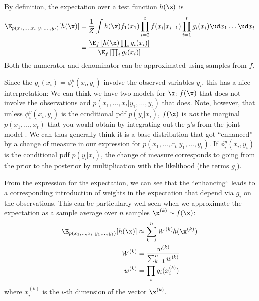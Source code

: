 \begin{exenumerate}
  \begin{solution}

    By definition, the expectation over a test function $h(\x)$ is
    \begin{align}
      \E_{p(x_1, \ldots, x_t | y_1,
        \ldots, y_t)}[ h(\x) ] & = \frac{1}{Z} \int h(\x) f_1(x_1) \prod_{i=2}^t f(x_i|x_{i-1})\prod_{i=1}^t g_i(x_i) \ud x_1 \ldots \ud x_t\\
      & = \frac{\E_f \left[ h(\x) \prod_i g_i(x_i) \right]}{\E_f\left [\prod_i g_i(x_i) \right]}
    \end{align}
    Both the numerator and denominator can be approximated using
    samples from $f$.

    Since the $g_i(x_i) = \phi_i^y(x_i,y_i)$ involve the observed
    variables $y_i$, this has a nice interpretation: We can think we
    have two models for $\x$: $f(\x)$ that does not involve the
    observations and $p(x_1, \ldots, x_t | y_1,\ldots, y_t)$ that
    does. Note, however, that unless $\phi_i^y(x_i, y_i)$ is the
    conditional pdf $p(y_i|x_i)$, $f(\x)$ is \emph{not} the marginal
    $p(x_1, \ldots, x_t)$ that you would obtain by integrating out the
    $y$'s from the joint model . We can thus generally think it is a
    base distribution that got ``enhanced'' by a change of measure in our expression for
    $p(x_1, \ldots, x_t| y_1,\ldots, y_t)$. If $\phi_i^y(x_i, y_i)$ is
    the conditional pdf $p(y_i|x_i)$, the change of measure
    corresponds to going from the prior to the posterior by
    multiplication with the likelihood (the terms $g_i$).

    From the expression for the expectation, we can see that the
    ``enhancing'' leads to a corresponding introduction of weights in
    the expectation that depend via $g_i$ on the observations. This
    can be particularly well seen when we approximate the expectation as
    a sample average over $n$ samples $\x^{(k)} \sim f(\x)$:
    \begin{align}
      \E_{p(x_1, \ldots, x_t | y_1, \ldots, y_t)}[ h(\x) ] & \approx \sum_{k=1}^n W^{(k)} h(\x^{(k)})\\
      W^{(k)} & =  \frac{w^{(k)}}{\sum_{k=1}^n  w^{(k)}}\\
      w^{(k)} & =  \prod_i g_i(x^{(k)}_i)
    \end{align}
    where $x^{(k)}_i$ is the $i$-th dimension of the vector $\x^{(k)}$.
  \end{solution}

\end{exenumerate}

